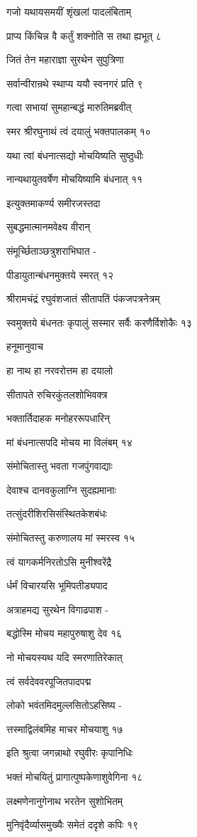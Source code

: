 गजो यथायसमयीं शृंखलां पादलंबिताम्

प्राप्य किंचिन्न वै कर्तुं शक्नोति स तथा ह्यभूत् ८

जितं तेन महाराज्ञा सुरथेन सुपुत्रिणा

सर्वान्वीरान्रथे स्थाप्य ययौ स्वनगरं प्रति ९

गत्वा सभायां सुमहान्बद्धं मारुतिमब्रवीत्

स्मर श्रीरघुनाथं त्वं दयालुं भक्तपालकम् १०

यथा त्वां बंधनात्सद्यो मोचयिष्यति सुष्ठुधीः

नान्यथायुतवर्षेण मोचयिष्यामि बंधनात् ११

इत्युक्तमाकर्ण्य समीरजस्तदा

सुबद्धमात्मानमवेक्ष्य वीरान्

संमूर्च्छिताञ्छत्रुशराभिघात -

पीडायुतान्बंधनमुक्तये स्मरत् १२

श्रीरामचंद्रं रघुवंशजातं सीतापतिं पंकजपत्रनेत्रम्

स्वमुक्तये बंधनतः कृपालुं सस्मार सर्वैः करणैर्विशोकैः १३

हनूमानुवाच

हा नाथ हा नरवरोत्तम हा दयालो

सीतापते रुचिरकुंतलशोभिवक्त्र

भक्तार्तिदाहक मनोहररूपधारिन्

मां बंधनात्सपदि मोचय मा विलंबम् १४

संमोचितास्तु भवता गजपुंगवाद्याः

देवाश्च दानवकुलाग्नि सुदह्यमानाः

तत्सुंदरीशिरसिसंस्थितकेशबंधः

संमोचितस्तु करुणालय मां स्मरस्व १५

त्वं यागकर्मनिरतोऽसि मुनीश्वरेंद्रै

र्धर्मं विचारयसि भूमिपतीड्यपाद

अत्राहमद्य सुरथेन विगाढपाश -

बद्धोस्मि मोचय महापुरुषाशु देव १६

नो मोचयस्यथ यदि स्मरणातिरेकात्

त्वं सर्वदेववरपूजितपादपद्म

लोको भवंतमिदमुल्लसितोऽहसिष्य -

त्तस्माद्विलंबमिह माचर मोचयाशु १७

इति श्रुत्वा जगन्नाथो रघुवीरः कृपानिधिः

भक्तं मोचयितुं प्रागात्पुष्पकेणाशुवेगिना १८

लक्ष्मणेनानुगेनाथ भरतेन सुशोभितम्

मुनिवृंदैर्व्यासमुख्यैः समेतं ददृशे कपिः १९

